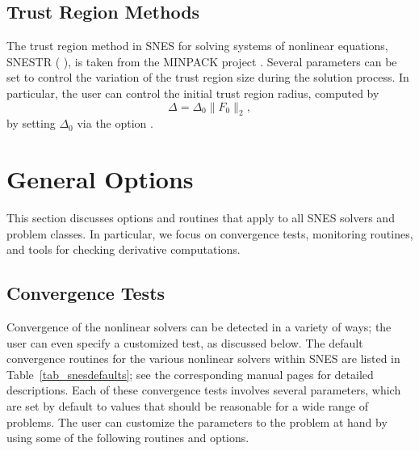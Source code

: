 \subsection{Trust Region Methods}

The trust region method in SNES for solving systems of nonlinear
equations, SNESTR ( ), is taken from
the MINPACK project \cite{more84}. Several parameters can be set to
control the variation of the trust region size during the solution
process.  In particular, the user can control the initial trust region
radius, computed by
\[
  \Delta = \Delta_0 \| F_0 \|_2,
\]
by setting $ \Delta_0 $ via the option 
.

\section{General Options}

This section discusses options and routines that apply to all SNES
solvers and problem classes.  In particular, we focus on convergence
tests, monitoring routines, and tools for checking derivative
computations.

\subsection{Convergence Tests}
\label{sec_snesconvergence}

Convergence of the nonlinear solvers can be detected in a variety of
ways; the user can even specify a customized test, as discussed
below.  The default convergence routines for
the various nonlinear solvers within SNES are listed in
Table~\ref{tab_snesdefaults}; see the corresponding manual pages for
detailed descriptions.  Each of these convergence tests involves
several parameters, which are set by default to values that should be
reasonable for a wide range of problems.  The user can customize the
parameters to the problem at hand by using some of the following
routines and options.

